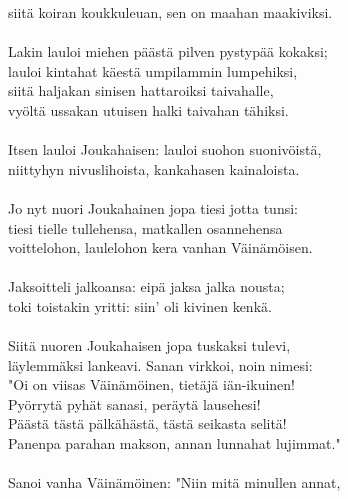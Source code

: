 siitä koiran koukkuleuan, sen on maahan maakiviksi.           \\
                                                              \\
Lakin lauloi miehen päästä pilven pystypää kokaksi;           \\
lauloi kintahat käestä umpilammin lumpehiksi,                 \\
siitä haljakan sinisen hattaroiksi taivahalle,                \\
vyöltä ussakan utuisen halki taivahan tähiksi.                \\
                                                              \\
Itsen lauloi Joukahaisen: lauloi suohon suonivöistä,          \\
niittyhyn nivuslihoista, kankahasen kainaloista.              \\
                                                              \\
Jo nyt nuori Joukahainen jopa tiesi jotta tunsi:              \\
tiesi tielle tullehensa, matkallen osannehensa                \\
voittelohon, laulelohon kera vanhan Väinämöisen.              \\
                                                              \\
Jaksoitteli jalkoansa: eipä jaksa jalka nousta;               \\
toki toistakin yritti: siin' oli kivinen kenkä.               \\
                                                              \\
Siitä nuoren Joukahaisen jopa tuskaksi tulevi,                \\
läylemmäksi lankeavi. Sanan virkkoi, noin nimesi:             \\
"Oi on viisas Väinämöinen, tietäjä iän-ikuinen!               \\
Pyörrytä pyhät sanasi, peräytä lausehesi!                     \\
Päästä tästä pälkähästä, tästä seikasta selitä!               \\
Panenpa parahan makson, annan lunnahat lujimmat."             \\
                                                              \\
Sanoi vanha Väinämöinen: "Niin mitä minullen annat,           \\
